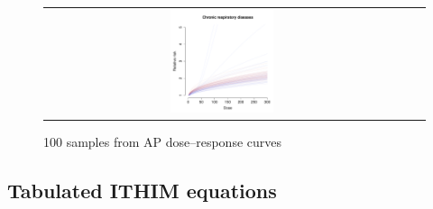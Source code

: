 \documentclass{article}
\begin{document}
\begin{appendix}
\begin{figure}[H]
\begin{tabular}{ccc}
\includegraphics[width=0.3\textwidth]{resp_copdDR-sim.pdf}\\
\end{tabular}
\caption{\small 100 samples from AP dose--response curves}
\label{APDR}
\end{figure}




\clearpage

\begin{landscape}
\section{Tabulated ITHIM equations}\label{tableequations}


\end{landscape}
\end{appendix}
\end{document}
